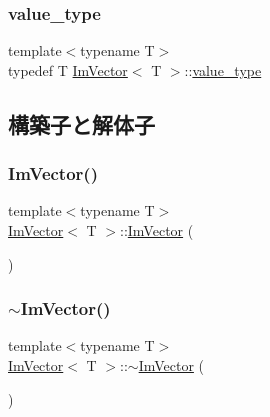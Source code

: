 \mbox{\label{class_im_vector_a8bd77e4e7581d8e5f9e98d7c2f3c2a80}} 
\subsubsection{\texorpdfstring{value\+\_\+type}{value\_type}}
{\footnotesize\ttfamily template$<$typename T$>$ \\
typedef T \mbox{\hyperlink{class_im_vector}{Im\+Vector}}$<$ T $>$\+::\mbox{\hyperlink{class_im_vector_a8bd77e4e7581d8e5f9e98d7c2f3c2a80}{value\+\_\+type}}}



\subsection{構築子と解体子}
\mbox{\label{class_im_vector_a547fff373659fd848c3ecc6b25a83f25}} 
\subsubsection{\texorpdfstring{Im\+Vector()}{ImVector()}}
{\footnotesize\ttfamily template$<$typename T$>$ \\
\mbox{\hyperlink{class_im_vector}{Im\+Vector}}$<$ T $>$\+::\mbox{\hyperlink{class_im_vector}{Im\+Vector}} (\begin{DoxyParamCaption}{ }\end{DoxyParamCaption})\hspace{0.3cm}{\ttfamily [inline]}}

\mbox{\label{class_im_vector_a9b782359ca26eaa1a6a6138fcf341c54}} 
\subsubsection{\texorpdfstring{$\sim$\+Im\+Vector()}{~ImVector()}}
{\footnotesize\ttfamily template$<$typename T$>$ \\
\mbox{\hyperlink{class_im_vector}{Im\+Vector}}$<$ T $>$\+::$\sim$\mbox{\hyperlink{class_im_vector}{Im\+Vector}} (\begin{DoxyParamCaption}{ }\end{DoxyParamCaption})\hspace{0.3cm}{\ttfamily [inline]}}



